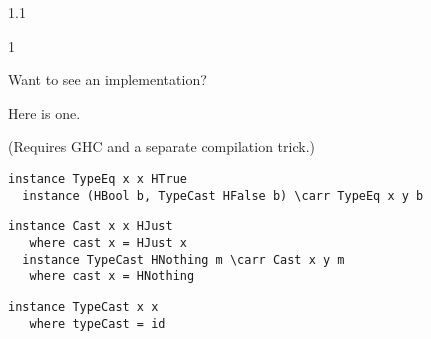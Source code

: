 \documentclass{slides}
\newenvironment{myslide}{\begin{slide}\color{Blue}\begin{boxedminipage}{1.1\hsize}\begin{boxedminipage}{1\hsize}\color{Black}
\vspace{-170\in}
}{%
\smallskip
\end{boxedminipage}
\end{boxedminipage}
\end{slide}}
\newenvironment{myslide}{\begin{slide}
}{%
\end{slide}}
\newenvironment{myslide}{\begin{slide}\color{White}\begin{boxedminipage}{1.1\hsize}\color{Black}
\vspace{-170\in}
}{%
\smallskip
\end{boxedminipage}
\end{slide}}
\newcommand{\header}[1]{{\large \color{Red} #1}}
\newcommand{\blau}[1]{{\vspace{-50\in}\normalsize \color{Blue} #1}}
\newcommand{\carr}{\ensuremath{\Rightarrow}}
\begin{document}
\begin{myslide}

\header{Want to see an implementation?}

\vspace{-77\in}

\blau{Here is one.}

\vspace{-77\in}

{\tiny (Requires GHC and a separate compilation trick.)}

\bigskip

\begin{Verbatim}[fontfamily=courier,fontsize=\tiny,commandchars=\\\{\}]
  instance TypeEq x x HTrue
  instance (HBool b, TypeCast HFalse b) \carr TypeEq x y b
\end{Verbatim}
\medskip
\begin{Verbatim}[fontfamily=courier,fontsize=\tiny,commandchars=\\\{\}]
  instance Cast x x HJust
   where cast x = HJust x
  instance TypeCast HNothing m \carr Cast x y m
   where cast x = HNothing
\end{Verbatim}
\medskip
\begin{Verbatim}[fontfamily=courier,fontsize=\tiny,commandchars=\\\{\}]
  instance TypeCast x x
   where typeCast = id
\end{Verbatim}

\end{myslide}



\end{document}
